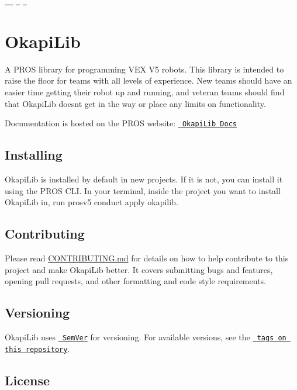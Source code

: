 \href{https://travis-ci.org/OkapiLib/OkapiLib}{\texttt{ }} \href{https://codecov.io/gh/OkapiLib/OkapiLib}{\texttt{ }} \href{https://github.com/OkapiLib/OkapiLib/releases}{\texttt{ }} \href{https://opensource.org/licenses/MPL-2.0}{\texttt{ }}

\section*{Okapi\+Lib}

A P\+R\+OS library for programming V\+EX V5 robots. This library is intended to raise the floor for teams with all levels of experience. New teams should have an easier time getting their robot up and running, and veteran teams should find that Okapi\+Lib doesn\textquotesingle{}t get in the way or place any limits on functionality.

Documentation is hosted on the P\+R\+OS website\+: \href{https://pros.cs.purdue.edu/v5/okapi/index.html}{\texttt{ Okapi\+Lib Docs}}

\subsection*{Installing}

Okapi\+Lib is installed by default in new projects. If it is not, you can install it using the P\+R\+OS C\+LI. In your terminal, inside the project you want to install Okapi\+Lib in, run {\ttfamily prosv5 conduct apply okapilib}.

\subsection*{Contributing}

Please read \mbox{\hyperlink{md_CONTRIBUTING}{C\+O\+N\+T\+R\+I\+B\+U\+T\+I\+NG.md}} for details on how to help contribute to this project and make Okapi\+Lib better. It covers submitting bugs and features, opening pull requests, and other formatting and code style requirements.

\subsection*{Versioning}

Okapi\+Lib uses \href{semver.org}{\texttt{ Sem\+Ver}} for versioning. For available versions, see the \href{https://github.com/OkapiLib/OkapiLib/tags}{\texttt{ tags on this repository}}.

\subsection*{License}

